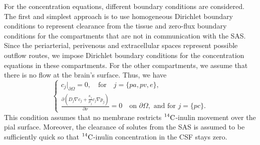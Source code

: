 \documentclass[a4paper,11pt]{article}
\newcommand{\1}{^{(1)}}
\newcommand{\2}{^{(2)}}
\newcommand{\Cinulin}{$\prescript{14}{}{\text{C}}$-inulin }
\begin{document}
For the concentration equations, different boundary conditions are considered. 
The first and simplest approach is to use homogeneous Dirichlet boundary conditions to represent clearance from the tissue and zero-flux boundary conditions for the compartments that are not in communication with the SAS. Since the periarterial, perivenous and extracellular spaces represent possible outflow routes, we impose Dirichlet boundary conditions for the concentration equations in these compartments. For the other compartments, we assume that there is no flow at the brain's surface. Thus, we have
\begin{equation*}
    \begin{cases}
    c_j \big|_{\partial \Omega} =  0 ,\quad \text{for}\quad j=\{pa,pv,e \}, \label{eq:Dirichlet} \\
    \frac{\partial\left( D_j \nabla c_j + \frac{\kappa_j}{\mu_j}c_j \nabla p_j\right)}{\partial \nu}  = 0\quad \text{on } \partial \Omega, \text{ and for } j = \{pc\}.
    \end{cases}
\end{equation*}
This condition assumes that no membrane restricts \Cinulin movement over the pial surface. Moreover, the clearance of solutes from the SAS is assumed to be sufficiently quick so that \Cinulin concentration in the CSF stays zero. 
\end{document}
